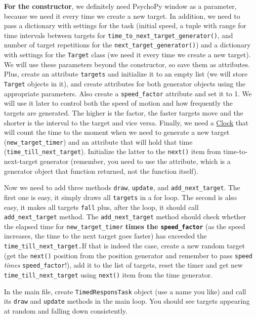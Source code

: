 \documentclass[
]{book}
\begin{document}
\textbf{For the constructor}, we definitely need PsychoPy window as a parameter, because we need it every time we create a new target. In addition, we need to pass a dictionary with settings for the task (initial speed, a tuple with range for time intervals between targets for \texttt{time\_to\_next\_target\_generator()}, and number of target repetitions for the \texttt{next\_target\_generator()}) and a dictionary with settings for the \texttt{Target} class (we need it every time we create a new target). We will use these parameters beyond the constructor, so save them as attributes. Plus, create an attribute \texttt{targets} and initialize it to an empty list (we will store \texttt{Target} objects in it), and create attributes for both generator objects using the appropriate parameters. Also create a \texttt{speed\_factor} attribute and set it to 1. We will use it later to control both the speed of motion and how frequently the targets are generated. The higher is the factor, the faster targets move and the shorter is the interval to the target and vice versa. Finally, we need a \href{https://psychopy.org/api/clock.html\#psychopy.clock.Clock}{Clock} that will count the time to the moment when we need to generate a new target (\texttt{new\_target\_timer}) and an attribute that will hold that time (\texttt{time\_till\_next\_target}). Initialize the latter to the \texttt{next()} item from time-to-next-target generator (remember, you need to use the attribute, which is a generator object that function returned, not the function itself).

Now we need to add three methods \texttt{draw}, \texttt{update}, and \texttt{add\_next\_target}. The first one is easy, it simply draws all \texttt{targets} in a for loop. The second is also easy, it makes all targets \texttt{fall} plus, after the loop, it should call \texttt{add\_next\_target} method. The \texttt{add\_next\_target} method should check whether the elapsed time for \texttt{new\_target\_timer} \textbf{times the \texttt{speed\_factor}} (as the speed increases, the time to the next target goes faster) has exceeded the \texttt{time\_till\_next\_target.}If that is indeed the case, create a new random target (get the \texttt{next()} position from the position generator and remember to pass \texttt{speed} \emph{times} \texttt{speed\_factor}!), add it to the list of targets, reset the timer and get new \texttt{time\_till\_next\_target} using \texttt{next()} item from the time generator.

In the main file, create \texttt{TimedResponsTask} object (use a name you like) and call its \texttt{draw} and \texttt{update} methods in the main loop. You should see targets appearing at random and falling down consistently.
\end{document}
